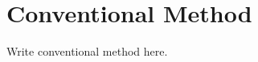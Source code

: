 \documentclass[a4paper,11pt,oneside,openany,fleqn]{jsbook}
\begin{document}
    \chapter{Conventional Method}
    Write conventional method here.
\end{document}
